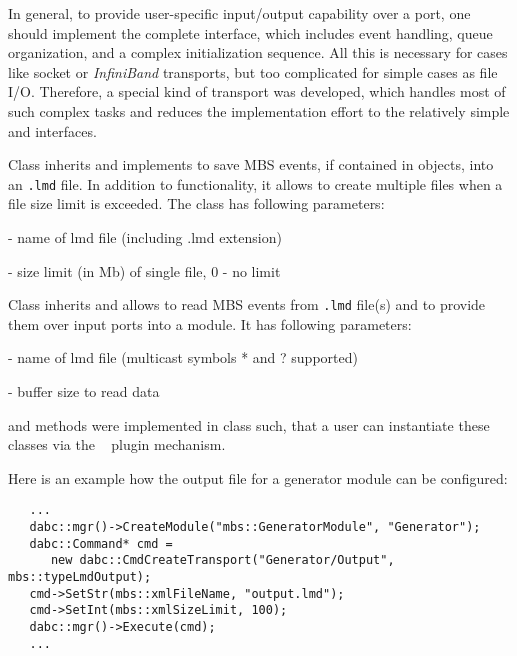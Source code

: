 In general, to provide user-specific input/output capability over a port, 
one should implement the complete  interface, which includes 
event handling, queue organization, and a complex initialization sequence. 
All this is necessary for cases like socket or {\em InfiniBand} transports, 
but too complicated for simple cases as file I/O. Therefore, a special kind of
transport  was developed, 
which handles most of such complex tasks
and reduces the implementation effort to the 
relatively simple  and
 interfaces.

Class  inherits  
and implements to save 
MBS events, if contained in  objects, into an {\tt \*.lmd} file. 
In addition to  functionality, it allows to create
multiple files when a file size limit is exceeded. The class has following parameters:
\bbul
\item {}      - name of lmd file (including .lmd extension)  
\item {} - size limit (in Mb) of single file, 0 - no limit
\ebul

Class  inherits  and allows to read 
MBS events from {\tt \*.lmd} file(s) and to provide them over input ports into a module. 
It has following parameters:
\bbul
\item {} - name of lmd file (multicast symbols * and ? supported)  
\item {}  - buffer size to read data
\ebul

 and  methods were implemented in  class such, 
that a user can instantiate these classes 
via the \dabc~ plugin mechanism. 
  

Here is an example how the output file for a generator module can be configured:
   
\begin{small}
\begin{verbatim}
   ...
   dabc::mgr()->CreateModule("mbs::GeneratorModule", "Generator");
   dabc::Command* cmd = 
      new dabc::CmdCreateTransport("Generator/Output", mbs::typeLmdOutput);
   cmd->SetStr(mbs::xmlFileName, "output.lmd");
   cmd->SetInt(mbs::xmlSizeLimit, 100);
   dabc::mgr()->Execute(cmd);
   ...
\end{verbatim}
\end{small}
       
